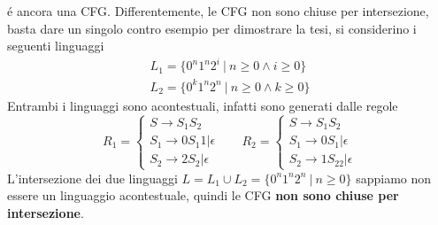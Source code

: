 \documentclass[10pt, letterpaper]{report}
\begin{document}
é ancora una CFG.
\acc 
Differentemente, le CFG non sono chiuse per intersezione, basta dare un singolo contro esempio per dimostrare la tesi, si 
considerino i seguenti linguaggi 
$$ \begin{matrix}
    L_1=\{0^n1^n2^i \ | \ n\ge 0\land i\ge 0\}\\ 
    L_2=\{0^k1^n2^n \ | \ n\ge 0\land k\ge 0\}
\end{matrix}$$
Entrambi i linguaggi sono acontestuali, infatti sono generati dalle regole 
$$ R_1=\begin{cases}
    S\longrightarrow S_1S_2\\ 
    S_1\longrightarrow0S_1 1|\epsilon\\ 
    S_2 \longrightarrow 2S_2|\epsilon
\end{cases} \ \ \ \ \ \ \ \ R_2=\begin{cases}
    S\longrightarrow S_1S_2\\ 
    S_1\longrightarrow0S_1 |\epsilon\\ 
    S_2 \longrightarrow 1S_22|\epsilon
\end{cases}$$
L'intersezione dei due linguaggi $L=L_1\cup L_2 = \{0^n1^n2^n \ | \ n\ge 0\}$ sappiamo  non essere un linguaggio acontestuale, 
quindi le CFG \textbf{non sono chiuse per intersezione}.
\end{document}
